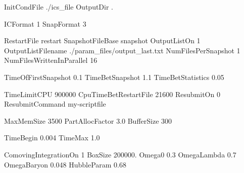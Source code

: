 
InitCondFile  ./ics_file  %
OutputDir     .  %

ICFormat    1  %
SnapFormat  3  %

RestartFile                 restart 
SnapshotFileBase            snapshot 
OutputListOn                1  %
OutputListFilename          ./param_files/output_last.txt  %
NumFilesPerSnapshot         1 
NumFilesWrittenInParallel   16  %

TimeOfFirstSnapshot     0.1 
TimeBetSnapshot         1.1 
TimeBetStatistics       0.05 

TimeLimitCPU            900000  %
CpuTimeBetRestartFile   21600 	%
ResubmitOn              0 
ResubmitCommand         my-scriptfile 

MaxMemSize          3500    %
PartAllocFactor     3.0     %
BufferSize          300     %

TimeBegin   0.004   %
TimeMax     1.0    %

ComovingIntegrationOn   1       %
BoxSize                 200000.  %
Omega0                  0.3    %
OmegaLambda             0.7    %
OmegaBaryon             0.048   %
HubbleParam             0.68     %

